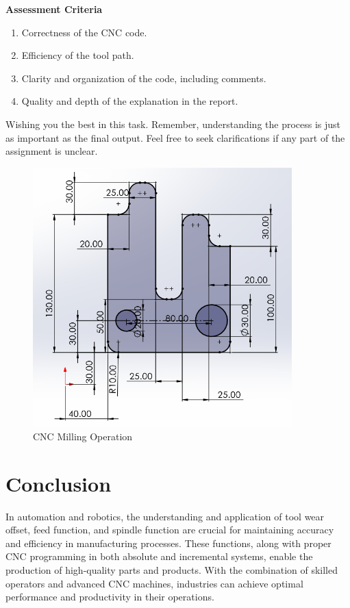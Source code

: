 \documentclass{article}
\begin{document}
\textbf{Assessment Criteria}\\

\begin{enumerate}
    \item Correctness of the CNC code.
    \item Efficiency of the tool path.
    \item Clarity and organization of the code, including comments.
    \item Quality and depth of the explanation in the report.
\end{enumerate}


Wishing you the best in this task. Remember, understanding the process is just as important as the final output. Feel free to seek clarifications if any part of the assignment is unclear.

\begin{figure}[h!]
\begin{center}
\includegraphics[width=10.0cm]{milling2}
\caption{CNC Milling Operation}
\label{fig2}
\end{center}
\end{figure}


\section*{Conclusion}

In automation and robotics, the understanding and application of tool wear offset, feed function, and spindle function are crucial for maintaining accuracy and efficiency in manufacturing processes. These functions, along with proper CNC programming in both absolute and incremental systems, enable the production of high-quality parts and products. With the combination of skilled operators and advanced CNC machines, industries can achieve optimal performance and productivity in their operations.\\
\end{document}
